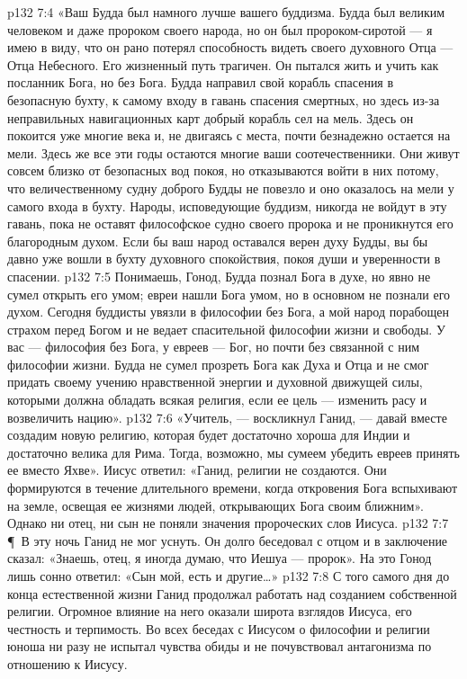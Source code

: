 \vs p132 7:4 «Ваш Будда был намного лучше вашего буддизма. Будда был великим человеком и даже пророком своего народа, но он был пророком\hyp{}сиротой --- я имею в виду, что он рано потерял способность видеть своего духовного Отца --- Отца Небесного. Его жизненный путь трагичен. Он пытался жить и учить как посланник Бога, но без Бога. Будда направил свой корабль спасения в безопасную бухту, к самому входу в гавань спасения смертных, но здесь из\hyp{}за неправильных навигационных карт добрый корабль сел на мель. Здесь он покоится уже многие века и, не двигаясь с места, почти безнадежно остается на мели. Здесь же все эти годы остаются многие ваши соотечественники. Они живут совсем близко от безопасных вод покоя, но отказываются войти в них потому, что величественному судну доброго Будды не повезло и оно оказалось на мели у самого входа в бухту. Народы, исповедующие буддизм, никогда не войдут в эту гавань, пока не оставят философское судно своего пророка и не проникнутся его благородным духом. Если бы ваш народ оставался верен духу Будды, вы бы давно уже вошли в бухту духовного спокойствия, покоя души и уверенности в спасении.
\vs p132 7:5 Понимаешь, Гонод, Будда познал Бога в духе, но явно не сумел открыть его умом; евреи нашли Бога умом, но в основном не познали его духом. Сегодня буддисты увязли в философии без Бога, а мой народ порабощен страхом перед Богом и не ведает спасительной философии жизни и свободы. У вас --- философия без Бога, у евреев --- Бог, но почти без связанной с ним философии жизни. Будда не сумел прозреть Бога как Духа и Отца и не смог придать своему учению нравственной энергии и духовной движущей силы, которыми должна обладать всякая религия, если ее цель --- изменить расу и возвеличить нацию».
\vs p132 7:6 «Учитель, --- воскликнул Ганид, --- давай вместе создадим новую религию, которая будет достаточно хороша для Индии и достаточно велика для Рима. Тогда, возможно, мы сумеем убедить евреев принять ее вместо Яхве». Иисус ответил: «Ганид, религии не создаются. Они формируются в течение длительного времени, когда откровения Бога вспыхивают на земле, освещая ее жизнями людей, открывающих Бога своим ближним». Однако ни отец, ни сын не поняли значения пророческих слов Иисуса.
\vs p132 7:7 \P\ В эту ночь Ганид не мог уснуть. Он долго беседовал с отцом и в заключение сказал: «Знаешь, отец, я иногда думаю, что Иешуа --- пророк». На это Гонод лишь сонно ответил: «Сын мой, есть и другие\ldots »
\vs p132 7:8 С того самого дня до конца естественной жизни Ганид продолжал работать над созданием собственной религии. Огромное влияние на него оказали широта взглядов Иисуса, его честность и терпимость. Во всех беседах с Иисусом о философии и религии юноша ни разу не испытал чувства обиды и не почувствовал антагонизма по отношению к Иисусу.
